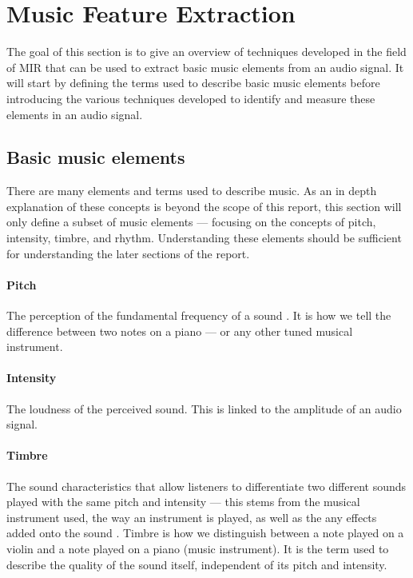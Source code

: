 \documentclass[../main_report2.tex]{subfiles}
\begin{document}
\section{Music Feature Extraction}
The goal of this section is to give an overview of techniques developed in the field of MIR that can be used to extract basic music elements from an audio signal. It will start by defining the terms used to describe basic music elements before introducing the various techniques developed to identify and measure these elements in an audio signal.

\subsection{Basic music elements}
There are many elements and terms used to describe music. As an in depth explanation of these concepts is beyond the scope of this report, this section will only define a subset of music elements --- focusing on the concepts of pitch, intensity, timbre, and rhythm. Understanding these elements should be sufficient for understanding the later sections of the report.

\paragraph{Pitch} The perception of the fundamental frequency of a sound \cite{Orio2006}. It is how we tell the difference between two notes on a piano --- or any other tuned musical instrument.

\paragraph{Intensity} The loudness of the perceived sound. This is linked to the amplitude of an audio signal.

\paragraph{Timbre} The sound characteristics that allow listeners to differentiate two different sounds played with the same pitch and intensity --- this stems from the musical instrument used, the way an instrument is played, as well as the any effects added onto the sound \cite{Orio2006}. Timbre is how we distinguish between a note played on a violin and a note played on a piano (music instrument). It is the term used to describe the quality of the sound itself, independent of its pitch and intensity.
\end{document}
